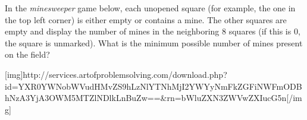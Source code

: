 In the \emph{minesweeper} game below, each unopened square (for example, the one in the top left corner) is either empty or contains a mine. The other squares are empty and display the number of mines in the neighboring 8 squares (if this is 0, the square is unmarked). What is the minimum possible number of mines present on the field?

[img]http://services.artofproblemsolving.com/download.php?id=YXR0YWNobWVudHMvZS9hLzNlYTNhMjI2YWYyNmFkZGFiNWFmODBhNzA3YjA3OWM5MTZlNDlkLnBuZw==&rn=bWluZXN3ZWVwZXIucG5n[/img]